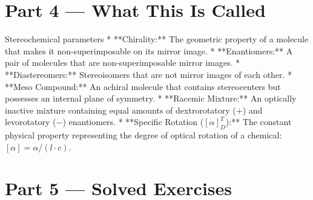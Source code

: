 \documentclass[12pt, a4paper]{book}
\begin{document}
\section{Part 4 --- What This Is Called}

\begin{namedconcept}{Stereochemical parameters}
* **Chirality:** The geometric property of a molecule that makes it non-superimposable on its mirror image.
* **Enantiomers:** A pair of molecules that are non-superimposable mirror images.
* **Diastereomers:** Stereoisomers that are not mirror images of each other.
* **Meso Compound:** An achiral molecule that contains stereocenters but possesses an internal plane of symmetry.
* **Racemic Mixture:** An optically inactive mixture containing equal amounts of dextrorotatory ($+$) and levorotatory ($-$) enantiomers.
* **Specific Rotation ($[\alpha]_D^T$):** The constant physical property representing the degree of optical rotation of a chemical: $[\alpha] = \alpha / (l \cdot c)$.
\end{namedconcept}

\newpage

\section{Part 5 --- Solved Exercises}
\end{document}
